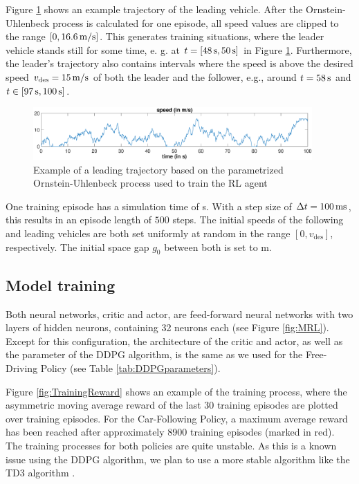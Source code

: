 \documentclass[review]{elsarticle}
\providecommand{\sub}[1]{_{\mathrm{#1}}}  %
\providecommand{\3}{{\ss}}
\begin{document}
	
	Figure \ref{fig:AR1process} shows an example trajectory of the leading
	vehicle. After the Ornstein-Uhlenbeck process is calculated for one
	episode, all speed values are clipped to the range $[0,\unit[16.6]{m/s}]$. This generates
	training situations, where the leader vehicle stands still for some
	time, e. g. at $t= [\unit[48]{s}, \unit[50]{s}]$ in Figure
	\ref{fig:AR1process}. Furthermore, the leader's trajectory
	also contains intervals where the speed is above the desired speed
	$v\sub{des}=\unit[15]{m/s}$ of both the leader and the follower,
	e.g., around $t=\unit[58]{s}$ and $t\in [\unit[97]{s},
	\unit[100]{s}]$.
	\begin{figure}
		\centering
		\includegraphics[width=0.95\textwidth]{images/AR1process}
		\caption{Example of a leading trajectory based on the parametrized Ornstein-Uhlenbeck process used to train the RL agent}
		\label{fig:AR1process}
	\end{figure}
	One training episode has a simulation time of \unit[50]{s}.  With a step size of
	$\Delta t=\unit[100]{ms}$, this results in an episode length of $500$
	steps. The initial speeds of the following and leading vehicles are both
	set uniformly at random in the range $[0,v\sub{des}]$,
	respectively. The initial space gap $g_0$ between both is set to \unit[120]{m}. 
	
	\subsection{Model training}
	Both neural networks, critic and actor, are feed-forward neural networks with two layers of hidden neurons, containing 32 neurons each (see Figure \ref{fig:MRL}). Except for this configuration, the architecture of the critic and actor, as well as the parameter of the DDPG algorithm, is the same as we used for the Free-Driving Policy (see Table \ref{tab:DDPGparameters}).
	
	Figure \ref{fig:TrainingReward} shows an example of the training
	process, where the asymmetric moving average reward of the last 30
	training episodes are plotted over training episodes. For the
	Car-Following Policy, a maximum average reward has been reached after
	approximately 8900 training episodes (marked in red). The training processes for both policies are quite unstable. As this is a known issue using the DDPG algorithm, we plan to use a more stable algorithm like the TD3 algorithm \citep{TD3}.    
	
\end{document}
